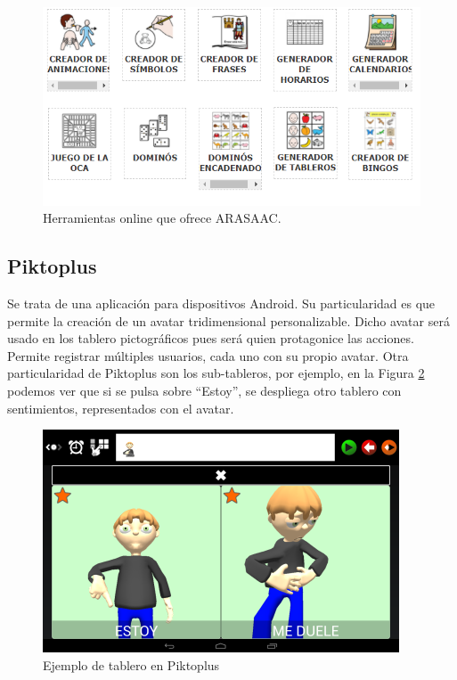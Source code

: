 \begin{figure}[h!]
	\centering
	\includegraphics[width=0.7\linewidth]{Imagenes/Bitmap/Tableros ARASAAC}
	\caption[Tableros web ARASAAC]{Herramientas online que ofrece ARASAAC.}
	\label{fig:tableros-arasaac}
\end{figure}

\newpage
\subsection{Piktoplus}
Se trata de una aplicación para dispositivos Android. Su particularidad es que permite la creación de un avatar tridimensional personalizable. Dicho avatar será usado en los tablero pictográficos pues será quien protagonice las acciones. Permite registrar múltiples usuarios, cada uno con su propio avatar. Otra particularidad de Piktoplus son los sub-tableros, por ejemplo, en la Figura \ref{fig:piktoplus1} podemos ver que si se pulsa sobre “Estoy”, se despliega otro tablero con sentimientos, representados con el avatar.

\begin{figure}[h!]
	\centering
	\includegraphics[width=0.7\linewidth]{Imagenes/Bitmap/Piktoplus1}
	\caption[Pictoplus tablero]{Ejemplo de tablero en Piktoplus}
	\label{fig:piktoplus1}
\end{figure}



